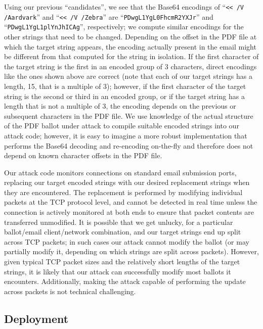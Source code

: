 \documentclass{article}
\begin{document}
Using our previous ``candidates'', we see that the Base64 encodings of
``\texttt{<{}< /V /Aardvark}'' and ``\texttt{<{}< /V
  /Zebra\textvisiblespace\textvisiblespace\textvisiblespace}'' are
``\texttt{PDwgL1YgL0FhcmR2YXJr}'' and
``\texttt{PDwgL1YgL1plYnJhICAg}'', respectively; we compute similar
encodings for the other strings that need to be changed. Depending on
the offset in the PDF file at which the target string appears, the
encoding actually present in the email might be different from that
computed for the string in isolation. If the first character of the
target string is the first in an encoded group of 3 characters, direct
encodings like the ones shown above are correct (note that each of our
target strings has a length, 15, that is a multiple of 3); however, if
the first character of the target string is the second or third in an
encoded group, or if the target string has a length that is not a
multiple of 3, the encoding depends on the previous or subsequent
characters in the PDF file. We use knowledge of the actual structure
of the PDF ballot under attack to compile suitable encoded strings
into our attack code; however, it is easy to imagine a more robust
implementation that performs the Base64 decoding and re-encoding
on-the-fly and therefore does not depend on known character offsets in
the PDF file.

Our attack code monitors connections on standard email submission
ports, replacing our target encoded strings with our desired
replacement strings when they are encountered. The replacement is
performed by modifying individual packets at the TCP protocol level,
and cannot be detected in real time unless the connection is actively
monitored at both ends to ensure that packet contents are transferred
unmodified. It is possible that we get unlucky, for a particular
ballot/email client/network combination, and our target strings end up
split across TCP packets; in such cases our attack cannot modify the
ballot (or may partially modify it, depending on which strings are
split across packets). However, given typical TCP packet sizes and the
relatively short lengths of the target strings, it is likely that our
attack can successfully modify most ballots it encounters.
Additionally, making the attack capable of performing the update
across packets is not technical challenging.

\subsection{Deployment}
\end{document}
